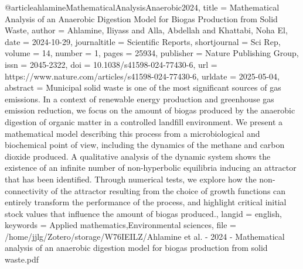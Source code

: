 @article{ahlamineMathematicalAnalysisAnaerobic2024,
  title = {Mathematical Analysis of an Anaerobic Digestion Model for Biogas Production from Solid Waste},
  author = {Ahlamine, Iliyass and Alla, Abdellah and Khattabi, Noha El},
  date = {2024-10-29},
  journaltitle = {Scientific Reports},
  shortjournal = {Sci Rep},
  volume = {14},
  number = {1},
  pages = {25934},
  publisher = {Nature Publishing Group},
  issn = {2045-2322},
  doi = {10.1038/s41598-024-77430-6},
  url = {https://www.nature.com/articles/s41598-024-77430-6},
  urldate = {2025-05-04},
  abstract = {Municipal solid waste is one of the most significant sources of gas emissions. In a context of renewable energy production and greenhouse gas emission reduction, we focus on the amount of biogas produced by the anaerobic digestion of organic matter in a controlled landfill environment. We present a mathematical model describing this process from a microbiological and biochemical point of view, including the dynamics of the methane and carbon dioxide produced. A qualitative analysis of the dynamic system shows the existence of an infinite number of non-hyperbolic equilibria inducing an attractor that has been identified. Through numerical tests, we explore how the non-connectivity of the attractor resulting from the choice of growth functions can entirely transform the performance of the process, and highlight critical initial stock values that influence the amount of biogas produced.},
  langid = {english},
  keywords = {Applied mathematics,Environmental sciences},
  file = {/home/jjlg/Zotero/storage/W76IEILZ/Ahlamine et al. - 2024 - Mathematical analysis of an anaerobic digestion model for biogas production from solid waste.pdf}
}

